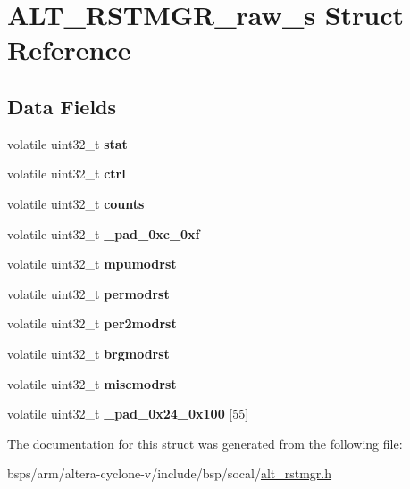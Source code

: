 \hypertarget{structALT__RSTMGR__raw__s}{}\section{A\+L\+T\+\_\+\+R\+S\+T\+M\+G\+R\+\_\+raw\+\_\+s Struct Reference}
\label{structALT__RSTMGR__raw__s}
\subsection*{Data Fields}
\begin{DoxyCompactItemize}
\item 
\mbox{\label{structALT__RSTMGR__raw__s_a0a0f11286ee815fbe2f978cc11025207}} 
volatile uint32\+\_\+t {\bfseries stat}
\item 
\mbox{\label{structALT__RSTMGR__raw__s_aa184ee61fb80f338623856a57b008331}} 
volatile uint32\+\_\+t {\bfseries ctrl}
\item 
\mbox{\label{structALT__RSTMGR__raw__s_a1825e5f877d36371dea9e317f493e3fb}} 
volatile uint32\+\_\+t {\bfseries counts}
\item 
\mbox{\label{structALT__RSTMGR__raw__s_a9805a74c9889ad19521cc2e757f4d25b}} 
volatile uint32\+\_\+t {\bfseries \+\_\+pad\+\_\+0xc\+\_\+0xf}
\item 
\mbox{\label{structALT__RSTMGR__raw__s_a438fb562bf3915e9331397475725d962}} 
volatile uint32\+\_\+t {\bfseries mpumodrst}
\item 
\mbox{\label{structALT__RSTMGR__raw__s_a57847702c20deb109fce8c2fc30700c1}} 
volatile uint32\+\_\+t {\bfseries permodrst}
\item 
\mbox{\label{structALT__RSTMGR__raw__s_af6dbde7498dd410767e92ca987872b78}} 
volatile uint32\+\_\+t {\bfseries per2modrst}
\item 
\mbox{\label{structALT__RSTMGR__raw__s_a551aeaaea2f8c61e904ff7ac7d346319}} 
volatile uint32\+\_\+t {\bfseries brgmodrst}
\item 
\mbox{\label{structALT__RSTMGR__raw__s_afe80de63795d89cfdde1bf051a474e0e}} 
volatile uint32\+\_\+t {\bfseries miscmodrst}
\item 
\mbox{\label{structALT__RSTMGR__raw__s_a93932127f47c1e9a37d78210c151c7ac}} 
volatile uint32\+\_\+t {\bfseries \+\_\+pad\+\_\+0x24\+\_\+0x100} \mbox{[}55\mbox{]}
\end{DoxyCompactItemize}


The documentation for this struct was generated from the following file\+:\begin{DoxyCompactItemize}
\item 
bsps/arm/altera-\/cyclone-\/v/include/bsp/socal/\mbox{\hyperlink{alt__rstmgr_8h}{alt\+\_\+rstmgr.\+h}}\end{DoxyCompactItemize}
